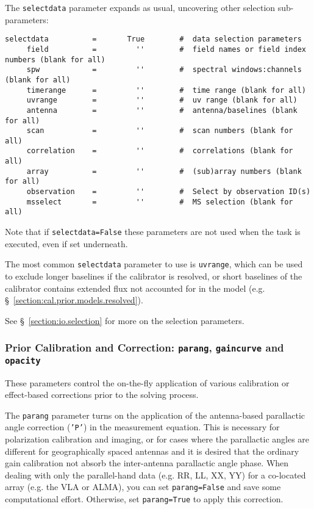 {The {\tt selectdata} parameter expands as usual, uncovering other
selection sub-parameters:
\small
\begin{verbatim}
selectdata          =       True        #  data selection parameters
     field          =         ''        #  field names or field index numbers (blank for all)
     spw            =         ''        #  spectral windows:channels (blank for all)
     timerange      =         ''        #  time range (blank for all)
     uvrange        =         ''        #  uv range (blank for all)
     antenna        =         ''        #  antenna/baselines (blank for all)
     scan           =         ''        #  scan numbers (blank for all)
     correlation    =         ''        #  correlations (blank for all)
     array          =         ''        #  (sub)array numbers (blank for all)
     observation    =         ''        #  Select by observation ID(s)
     msselect       =         ''        #  MS selection (blank for all)
\end{verbatim}
\normalsize
Note that if {\tt selectdata=False} these parameters are not used when
the task is executed, even if set underneath.

The most common {\tt selectdata} parameter to use is {\tt uvrange},
which can be used to exclude longer baselines if the calibrator is
resolved, or short baselines of the calibrator contains extended flux
not accounted for in the model 
(e.g. \S~\ref{section:cal.prior.models.resolved}).

See \S~\ref{section:io.selection} for more on the selection parameters.

\subsubsection{Prior Calibration and Correction: {\tt parang}, {\tt gaincurve} and
   {\tt opacity} }
\label{section:cal.solve.pars.prior}

These parameters control the on-the-fly application of various
calibration or effect-based corrections prior to the solving process.

The {\tt parang} parameter turns on the application of the
antenna-based parallactic angle correction ({\tt 'P'}) in the
measurement equation.  This is necessary for polarization calibration
and imaging, or for cases where the parallactic angles are different
for geographically spaced antennas and it is desired that the ordinary
gain calibration not absorb the inter-antenna parallactic angle phase.  
When dealing with only the parallel-hand data (e.g. RR, LL, XX, YY)
for a co-located array (e.g. the VLA or ALMA), you can set {\tt  parang=False} 
and save some computational effort.  Otherwise, set {\tt parang=True} to apply
this correction.

}
